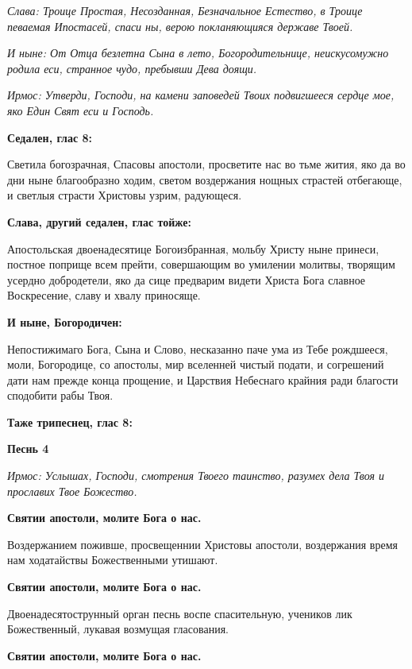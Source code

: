 \itshape Слава\normalfont{}: Троице Простая, Несозданная, Безначальное Естество, в Троице певаемая Ипостасей, спаси ны, верою покланяющияся державе Твоей.


\itshape И ныне\normalfont{}: От Отца безлетна Сына в лето, Богородительнице, неискусомужно родила еси, странное чудо, пребывши Дева доящи.


\itshape Ирмос\normalfont{}: Утверди, Господи, на камени заповедей Твоих подвигшееся сердце мое, яко Един Свят еси и Господь. 

\medskip\bfseries Седален, глас 8:\normalfont{}


Светила богозрачная, Спасовы апостоли, просветите нас во тьме жития, яко да во дни ныне благообразно ходим, светом воздержания нощных страстей отбегающе, и светлыя страсти Христовы узрим, радующеся. 

\medskip\bfseries Слава, другий седален, глас тойже:\normalfont{}


Апостольская двоенадесятице Богоизбранная, мольбу Христу ныне принеси, постное поприще всем прейти, совершающим во умилении молитвы, творящим усердно добродетели, яко да сице предварим видети Христа Бога славное Воскресение, славу и хвалу приносяще. 


\medskip
\bfseries И ныне, Богородичен:\normalfont{}



Непостижимаго Бога, Сына и Слово, несказанно паче ума из Тебе рождшееся, моли, Богородице, со апостолы, мир вселенней чистый подати, и согрешений дати нам прежде конца прощение, и Царствия Небеснаго крайния ради благости сподобити рабы Твоя. 


\medskip
\bfseries Таже трипеснец, глас 8:\normalfont{}


\medskip
\bfseries Песнь 4\normalfont{}


\itshape Ирмос\normalfont{}: Услышах, Господи, смотрения Твоего таинство, разумех дела Твоя и прославих Твое Божество.


\bfseries Святии апостоли, молите Бога о нас.\normalfont{}


Воздержанием поживше, просвещеннии Христовы апостоли, воздержания время нам ходатайствы Божественными утишают.


\bfseries Святии апостоли, молите Бога о нас.\normalfont{}


Двоенадесятострунный орган песнь воспе спасительную, учеников лик Божественный, лукавая возмущая гласования.


\bfseries Святии апостоли, молите Бога о нас.\normalfont{}


